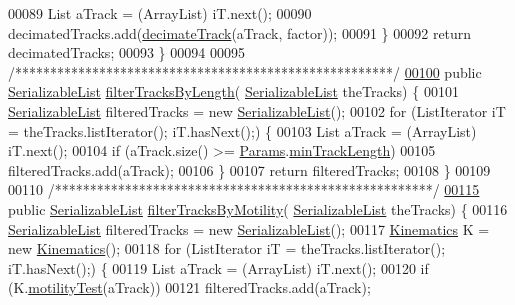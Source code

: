 \begin{DoxyCode}
00089       List aTrack = (ArrayList) iT.next();
00090       decimatedTracks.add(\hyperlink{classfunctions_1_1_signal_processing_ab5068ef8536594355df9d576ba97dd57}{decimateTrack}(aTrack, factor));
00091     \}
00092     \textcolor{keywordflow}{return} decimatedTracks;
00093   \}
00094 
00095   \textcolor{comment}{/******************************************************/}
\hypertarget{_signal_processing_8java_source_l00100}{}\hyperlink{classfunctions_1_1_signal_processing_a032b1dff0d4763927928158714db911f}{00100}   \textcolor{keyword}{public} \hyperlink{classdata_1_1_serializable_list}{SerializableList} \hyperlink{classfunctions_1_1_signal_processing_a032b1dff0d4763927928158714db911f}{filterTracksByLength}(
      \hyperlink{classdata_1_1_serializable_list}{SerializableList} theTracks) \{
00101     \hyperlink{classdata_1_1_serializable_list}{SerializableList} filteredTracks = \textcolor{keyword}{new} \hyperlink{classdata_1_1_serializable_list}{SerializableList}();
00102     \textcolor{keywordflow}{for} (ListIterator iT = theTracks.listIterator(); iT.hasNext();) \{
00103       List aTrack = (ArrayList) iT.next();
00104       \textcolor{keywordflow}{if} (aTrack.size() >= \hyperlink{classdata_1_1_params}{Params}.\hyperlink{classdata_1_1_params_aa730fe10ba7a04b3871e8ff2ea8cc834}{minTrackLength})
00105         filteredTracks.add(aTrack);
00106     \}
00107     \textcolor{keywordflow}{return} filteredTracks;
00108   \}
00109 
00110   \textcolor{comment}{/******************************************************/}
\hypertarget{_signal_processing_8java_source_l00115}{}\hyperlink{classfunctions_1_1_signal_processing_a7302e4cf91bc23463aa9354325d2993d}{00115}   \textcolor{keyword}{public} \hyperlink{classdata_1_1_serializable_list}{SerializableList} \hyperlink{classfunctions_1_1_signal_processing_a7302e4cf91bc23463aa9354325d2993d}{filterTracksByMotility}(
      \hyperlink{classdata_1_1_serializable_list}{SerializableList} theTracks) \{
00116     \hyperlink{classdata_1_1_serializable_list}{SerializableList} filteredTracks = \textcolor{keyword}{new} \hyperlink{classdata_1_1_serializable_list}{SerializableList}();
00117     \hyperlink{classfunctions_1_1_kinematics}{Kinematics} K = \textcolor{keyword}{new} \hyperlink{classfunctions_1_1_kinematics}{Kinematics}();
00118     \textcolor{keywordflow}{for} (ListIterator iT = theTracks.listIterator(); iT.hasNext();) \{
00119       List aTrack = (ArrayList) iT.next();
00120       \textcolor{keywordflow}{if} (K.\hyperlink{classfunctions_1_1_kinematics_a5dbef047c19d4c554b08ba879eb7443f}{motilityTest}(aTrack))
00121         filteredTracks.add(aTrack);

\end{DoxyCode}
